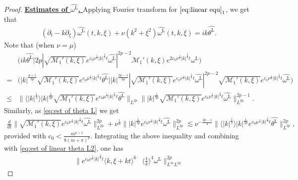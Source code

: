 \documentclass[10pt,a4paper]{amsart}
\newcommand{\pt}{\partial_t}
\newcommand{\pxi}{\partial_\xi}
\begin{document}
\begin{proof}
		
		\underline{\bf Estimates of  $\widehat{\omega^{\mathrm{L}}}$. }
		Applying Fourier transform for $\eqref{eq:linear equ}_1$, we get that 
		\begin{equation*}\begin{aligned} \label{eq:linear Fourier for omega}
				(\pt- k\pxi) \widehat{\omega^{\mathrm{L}} }(t, k, \xi)  + \nu(k^2 + \xi^2) \widehat{\omega ^{\mathrm{L}} }(t, k, \xi)   = ik \widehat{\theta ^{\mathrm{L}}}.
		\end{aligned}\end{equation*}
		Note that (when $\nu=\mu$)
		\small{\begin{align*}
				&\big( ik  \widehat{\theta ^{\mathrm{L}}} \big| 2p | \sqrt{\mathcal{M}_1'(k, \xi)} e^{c_0 \nu^\frac13 |k|^\frac23 t} \widehat{\omega^{\mathrm{L}} }|^{2p-2} \mathcal{M}_1'(k, \xi) e^{2c_0 \nu^\frac13 |k|^\frac23 t} \widehat{\omega^{\mathrm{L}} } \big)\\
				=& \big( |k|^{\frac{p+1}{3p}} \sqrt{\mathcal{M}_1'(k, \xi) } e^{c_0 \mu^\frac13 |k|^\frac23 t}  \widehat{\theta ^{\mathrm{L}}} \big| |k|^\frac{2p-1}{3p}| \sqrt{\mathcal{M}_1'(k, \xi)} e^{c_0 \nu^\frac13 |k|^\frac23 t} \widehat{\omega^{\mathrm{L}} }|^{2p-2} \sqrt{\mathcal{M}_1'(k, \xi) }  e^{c_0 \nu^\frac13 |k|^\frac23 t} \widehat{\omega^{\mathrm{L}} } \big)\\
				\leq & \| \langle|k|^\frac13 \rangle|k|^\frac{1}{3p}  \sqrt{\mathcal{M}_1'(k, \xi)} e^{c_0 \mu^\frac13 |k|^\frac23 t} \widehat{\theta^{\mathrm{L}} }\|_{L^{2p}}  \| |k|^\frac{1}{3p}  \sqrt{\mathcal{M}_1'(k, \xi)} e^{c_0 \nu^\frac13 |k|^\frac23 t} \widehat{\omega^{\mathrm{L}} }\|_{L^{2p}}^{2p-1}.
		\end{align*}}
		Similarly, as \eqref{eq:est of theta L} we get 
		\begin{align*}
			\frac{d}{dt} \|  \sqrt{\mathcal{M}_1'(k, \xi)} e^{c_0 \nu^\frac13 |k|^\frac23 t} \widehat{\omega^{\mathrm{L}} } \|_{L^{2p}}^{2p}  +  \nu^\frac13  \| |k|^\frac{1}{3p} e^{c_0 \nu^\frac13 |k|^\frac23 t} \widehat{\omega^{\mathrm{L}} }\|_{L^{2p}}^{2p} 
			\lesssim \nu^{-\frac{2p-1}{3}} \| \langle|k|^\frac13 \rangle|k|^\frac{1}{3p}  e^{c_0 \mu^\frac13 |k|^\frac23 t} \widehat{\theta^{\mathrm{L}} }\|_{L^{2p}}^{2p},
		\end{align*}
		provided with $c_0 <  \frac{m^{p-1}}{8(m+\pi)^p}$. Integrating the above inequality and combining with \eqref{eq:est of linear theta L2}, one has
		\begin{equation}\begin{aligned} \label{eq:est of linear omega L2}
				\|  e^{c_0 \nu^\frac13 |k|^\frac23 t} \langle k, \xi + kt\rangle^6 & \langle \frac{1}{k}\rangle^4 \widehat{\omega^{\mathrm{L}}} \|_{L^\infty L^{2p}}^{2p} 

\end{aligned}
\end{equation}
\end{proof}
\end{document}
